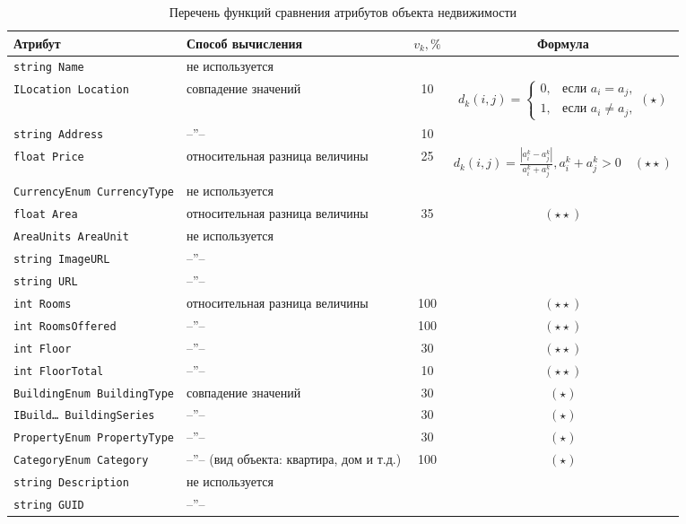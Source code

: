 \documentclass[a4paper,14pt,openany,final]{extreport} %
\def\oldcaption{} \let\oldcaption=\caption
\def\caption{\stepcounter{captionsnum}\oldcaption}
\begin{document}
{\begin{table}[htbp]\footnotesize
  \caption{Перечень функций сравнения атрибутов объекта недвижимости}
  \label{tab:attrdiff}
  \centering
  \begin{tabular}{|l|p{5cm}|c|c|}
    \hline
    Атрибут & Способ вычисления & $v_k, \%$ & Формула \\
    \hline
\texttt{string Name} & не используется & & \\
    \texttt{ILocation Location} & совпадение значений & 10 & $d_k(i,j) = \left\{
                                                          \begin{array}{ll}
                                                            0, & \mbox{если\ \ } a_i=a_j,\\
                                                            1, & \mbox{если\ \ } a_i\neq a_j,
                                                          \end{array}
                                                          \right. (\star)$
    \\
\texttt{string Address} & --''-- & 10 & \\
\texttt{float Price} & относительная разница величины & 25 & $d_k(i,j) = \frac{|a_i^k-a_j^k|}{a_i^k+a_j^k}, a_i^k+a_j^k>0\quad(\star\star)$\\
\texttt{CurrencyEnum CurrencyType} & не используется  & & \\
\texttt{float Area} & относительная разница величины  & 35 & $(\star\star)$\\
\texttt{AreaUnits AreaUnit} & не используется & &\\
\texttt{string ImageURL} & --''-- & & \\
\texttt{string URL} & --''-- & & \\
\texttt{int Rooms}  & относительная разница величины  & 100 & $(\star\star)$\\
\texttt{int RoomsOffered} &  --''--   & 100 & $(\star\star)$\\
\texttt{int Floor}  &  --''--   & 30 & $(\star\star)$\\
\texttt{int FloorTotal}  &  --''--   & 10 & $(\star\star)$\\
\texttt{BuildingEnum BuildingType}  & совпадение значений & 30 & $(\star)$\\
\texttt{IBuild\ldots{} BuildingSeries}  & --''-- & 30 &  $(\star)$\\
\texttt{PropertyEnum PropertyType} & --''-- & 30 &  $(\star)$\\
\texttt{CategoryEnum Category} & --''-- (вид объекта: квартира, дом и т.д.) & 100 &  $(\star)$\\
\texttt{string Description} & не используется & & \\
    \texttt{string GUID} & --''-- & & \\
    \hline
  \end{tabular}


\end{table}}
\end{document}

